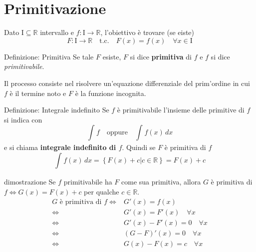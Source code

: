 \documentclass[x11names]{article}
\begin{document}
	\newpage
	\section{Primitivazione}
	Dato $\text{I} \subseteq \mathbb{R}$ intervallo e $f:\text{I} \to \mathbb{R}$, l'obiettivo è  trovare (se eiste)
	\[
	F: \text{I} \to \mathbb{R} \quad \text{t.c.} \quad F(x) = f(x) \quad \forall x \in \text{I}
	\]
	
		\begin{center}
		\colorbox{myblue}{\begin{minipage}{5.75in}
				\begin{blues}{Definizione: Primitiva}
					Se tale $F$ esiste, $F$ si dice \textbf{primitiva} di $f$ e $f$ si dice \textit{primitivabile}. 
				\end{blues}
		\end{minipage}}       
	\end{center}
	Il processo consiste nel risolvere un'equazione differenziale del prim'ordine in cui $f$ è il termine noto e $F$ è la funzione incognita.
	
		\begin{center}
		\colorbox{myblue}{\begin{minipage}{5.75in}
				\begin{blues}{Definizione: Integrale indefinito}
					Se $f$ è primitivabile l'insieme delle primitive di $f$ si indica con 
					\[
					\int_{}^{}f \quad \text{oppure} \quad \int_{}^{}f(x) \,dx
					\]
					e si chiama \textbf{integrale indefinito di $f$}. Quindi se  $F$ è primitiva di $f$
					\[
					\int_{}^{}f(x) \,dx  = \left\{F(x) + c | c \in \mathbb{R}\right\} = F(x) + c
					\]
				\end{blues}
		\end{minipage}}       
	\end{center}
	\begin{es}{dimostrazione}
		Se $f$ primitivabile ha $F$ come sua primitiva, allora $G$ è primitiva di $f \Longleftrightarrow G(x) = F(x) + c$ per qualche $c \in \mathbb{R}$.
		\begin{align*}
			G \text{ è primitiva di } f \Longleftrightarrow& G'(x) = f(x) \\
			\Longleftrightarrow& G'(x) = F'(x) \quad \forall x \\
			\Longleftrightarrow& G'(x) - F'(x) = 0 \quad \forall x \\
			\Longleftrightarrow& \left(G - F\right)'(x) = 0 \quad \forall x \\
			\Longleftrightarrow& G(x) - F(x) = c \quad \forall x 
		\end{align*}
	\end{es}
	
\end{document}
